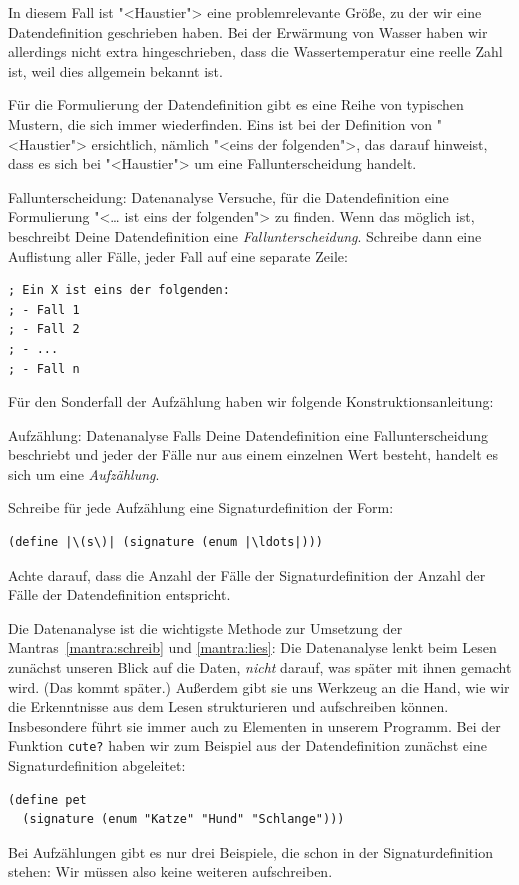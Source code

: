 In diesem Fall ist "<Haustier"> eine problemrelevante Größe, zu der
wir eine Datendefinition geschrieben haben.  Bei der Erwärmung von
Wasser haben wir allerdings nicht extra hingeschrieben, dass die
Wassertemperatur eine reelle Zahl ist, weil dies allgemein bekannt
ist.

Für die Formulierung der Datendefinition gibt es eine Reihe von
typischen Mustern, die sich immer wiederfinden.  Eins ist bei der
Definition von "<Haustier"> ersichtlich, nämlich "<eins der
folgenden">, das darauf hinweist, dass es sich bei "<Haustier"> um
eine Fallunterscheidung handelt.  

\begin{konstruktionsanleitung}{Fallunterscheidung: Datenanalyse}
  \label{ka:fallunterscheidung}
  Versuche, für die Datendefinition eine Formulierung "<\ldots{}
    ist eins der folgenden"> zu finden. Wenn das möglich ist, beschreibt
  Deine Datendefinition eine
  \textit{Fallunterscheidung}.  Schreibe
  dann eine Auflistung aller Fälle, jeder Fall auf eine separate
  Zeile:
  
\begin{lstlisting}
; Ein X ist eins der folgenden:
; - Fall 1
; - Fall 2
; - ...
; - Fall n
\end{lstlisting}
\end{konstruktionsanleitung}
%
Für den Sonderfall der Aufzählung haben wir folgende Konstruktionsanleitung:
%
\begin{konstruktionsanleitung}{Aufzählung: Datenanalyse}
  \label{ka:aufzaehlung}
  Falls Deine Datendefinition eine Fallunterscheidung beschriebt und
  jeder der Fälle nur aus einem einzelnen Wert besteht, handelt es
  sich um eine \textit{Aufzählung}.

  Schreibe für jede Aufzählung eine Signaturdefinition der Form:
\begin{lstlisting}
(define |\(s\)| (signature (enum |\ldots|)))
\end{lstlisting}
  Achte darauf, dass die Anzahl der Fälle der Signaturdefinition der
  Anzahl der Fälle der Datendefinition entspricht.
\end{konstruktionsanleitung}
%
Die Datenanalyse ist die wichtigste Methode zur Umsetzung der
Mantras~\ref{mantra:schreib} und \ref{mantra:lies}:
%
\mantraschreib*
%
\mantralies*
%
\noindent Die Datenanalyse lenkt beim Lesen zunächst unseren Blick auf die
Daten, \emph{nicht} darauf, was später mit ihnen gemacht wird.  (Das
kommt später.)  Außerdem gibt sie uns Werkzeug an die Hand, wie wir
die Erkenntnisse aus dem Lesen strukturieren und aufschreiben können.
Insbesondere führt sie immer auch zu Elementen in unserem Programm.
Bei der Funktion \lstinline{cute?} haben wir zum Beispiel aus der
Datendefinition zunächst eine Signaturdefinition abgeleitet:
%
\begin{lstlisting}
(define pet
  (signature (enum "Katze" "Hund" "Schlange")))
\end{lstlisting}
%
Bei Aufzählungen gibt es nur drei Beispiele, die schon in der
Signaturdefinition stehen: Wir müssen also keine weiteren
aufschreiben.

